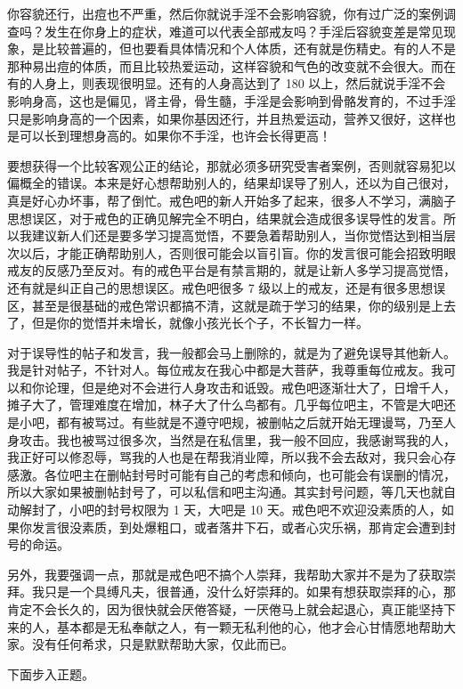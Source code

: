 你容貌还行，出痘也不严重，然后你就说手淫不会影响容貌，你有过广泛的案例调查吗？发生在你身上的症状，难道可以代表全部戒友吗？手淫后容貌变差是常见现象，是比较普遍的，但也要看具体情况和个人体质，还有就是伤精史。有的人不是那种易出痘的体质，而且比较热爱运动，这样容貌和气色的改变就不会很大。而在有的人身上，则表现很明显。还有的人身高达到了 180 以上，然后就说手淫不会影响身高，这也是偏见，肾主骨，骨生髓，手淫是会影响到骨骼发育的，不过手淫只是影响身高的一个因素，如果你基因还行，并且热爱运动，营养又很好，这样也是可以长到理想身高的。如果你不手淫，也许会长得更高！

要想获得一个比较客观公正的结论，那就必须多研究受害者案例，否则就容易犯以偏概全的错误。本来是好心想帮助别人的，结果却误导了别人，还以为自己很对，真是好心办坏事，帮了倒忙。戒色吧的新人开始多了起来，很多人不学习，满脑子思想误区，对于戒色的正确见解完全不明白，结果就会造成很多误导性的发言。所以我建议新人们还是要多学习提高觉悟，不要急着帮助别人，当你觉悟达到相当层次以后，才能正确帮助别人，否则很可能会以盲引盲。你的发言很可能会招致明眼戒友的反感乃至反对。有的戒色平台是有禁言期的，就是让新人多学习提高觉悟，还有就是纠正自己的思想误区。戒色吧很多 7 级以上的戒友，还是有很多思想误区，甚至是很基础的戒色常识都搞不清，这就是疏于学习的结果，你的级别是上去了，但是你的觉悟并未增长，就像小孩光长个子，不长智力一样。

对于误导性的帖子和发言，我一般都会马上删除的，就是为了避免误导其他新人。我是针对帖子，不针对人。每位戒友在我心中都是大菩萨，我尊重每位戒友。我可以和你论理，但是绝对不会进行人身攻击和诋毁。戒色吧逐渐壮大了，日增千人，摊子大了，管理难度在增加，林子大了什么鸟都有。几乎每位吧主，不管是大吧还是小吧，都有被骂过。有些就是不遵守吧规，被删帖之后就开始无理谩骂，乃至人身攻击。我也被骂过很多次，当然是在私信里，我一般不回应，我感谢骂我的人，我正好可以修忍辱，骂我的人也是在帮我消业障，所以我不会去敌对，我只会心存感激。各位吧主在删帖封号时可能有自己的考虑和倾向，也可能会有误删的情况，所以大家如果被删帖封号了，可以私信和吧主沟通。其实封号问题，等几天也就自动解封了，小吧的封号权限为 1 天，大吧是 10 天。戒色吧不欢迎没素质的人，如果你发言很没素质，到处爆粗口，或者落井下石，或者心灾乐祸，那肯定会遭到封号的命运。

另外，我要强调一点，那就是戒色吧不搞个人崇拜，我帮助大家并不是为了获取崇拜。我只是一个具缚凡夫，很普通，没什么好崇拜的。如果有想获取崇拜的心，那肯定不会长久的，因为很快就会厌倦答疑，一厌倦马上就会起退心，真正能坚持下来的人，基本都是无私奉献之人，有一颗无私利他的心，他才会心甘情愿地帮助大家。没有任何希求，只是默默帮助大家，仅此而已。

下面步入正题。

